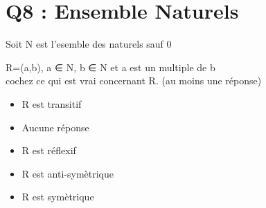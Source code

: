 \newpage
\section{Q8 : Ensemble Naturels}
\vspace{5mm} %

Soit N est l’esemble des naturels sauf 0

  R={(a,b), a ∈ N, b ∈ N et a est un multiple de b }\\


cochez ce qui est vrai concernant R. (au moins une réponse)\\
\begin{itemize}[label=$\square$]
\item R est transitif
\item Aucune réponse
\item R est réflexif
\item R est anti-symètrique
\item R est symètrique
\end{itemize}
